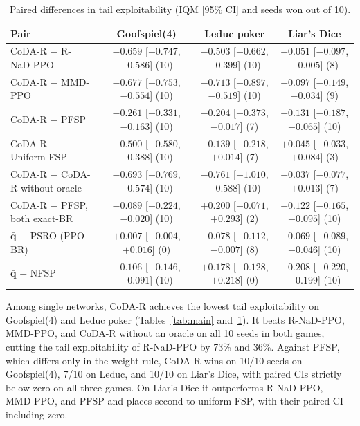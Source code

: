 \documentclass{article}
\theoremstyle{plain}
\theoremstyle{remark}
\newcommand{\bq}{{\bm{q}}}
\newcommand{\codar}{CoDA-R}
\newcommand{\rnad}{R-NaD-PPO}
\begin{document}
\begin{table}[t]
\caption{Paired differences in tail exploitability (IQM [95\% CI] and seeds won out of 10).}
\label{tab:paired}
\begin{center}
\scriptsize
\setlength{\tabcolsep}{2.5pt}
\begin{tabular}{lccc}
\toprule
Pair & Goofspiel(4) & Leduc poker & Liar's Dice \\
\midrule
\codar{} $-$ \rnad{} & $-0.659$ [$-0.747$, $-0.586$] (10) & $-0.503$ [$-0.662$, $-0.399$] (10) & $-0.051$ [$-0.097$, $-0.005$] (8) \\
\codar{} $-$ MMD-PPO & $-0.677$ [$-0.753$, $-0.554$] (10) & $-0.713$ [$-0.897$, $-0.519$] (10) & $-0.097$ [$-0.149$, $-0.034$] (9) \\
\codar{} $-$ PFSP & $-0.261$ [$-0.331$, $-0.163$] (10) & $-0.204$ [$-0.373$, $-0.017$] (7) & $-0.131$ [$-0.187$, $-0.065$] (10) \\
\codar{} $-$ Uniform FSP & $-0.500$ [$-0.580$, $-0.388$] (10) & $-0.139$ [$-0.218$, $+0.014$] (7) & $+0.045$ [$-0.033$, $+0.084$] (3) \\
\codar{} $-$ \codar{} without oracle & $-0.693$ [$-0.769$, $-0.574$] (10) & $-0.761$ [$-1.010$, $-0.588$] (10) & $-0.037$ [$-0.077$, $+0.013$] (7) \\
\codar{} $-$ PFSP, both exact-BR & $-0.089$ [$-0.224$, $-0.020$] (10) & $+0.200$ [$+0.071$, $+0.293$] (2) & $-0.122$ [$-0.165$, $-0.095$] (10) \\
$\bar{\bq}$ $-$ PSRO (PPO BR) & $+0.007$ [$+0.004$, $+0.016$] (0) & $-0.078$ [$-0.112$, $-0.007$] (8) & $-0.069$ [$-0.089$, $-0.046$] (10) \\
$\bar{\bq}$ $-$ NFSP & $-0.106$ [$-0.146$, $-0.091$] (10) & $+0.178$ [$+0.128$, $+0.218$] (0) & $-0.208$ [$-0.220$, $-0.199$] (10) \\
\bottomrule
\end{tabular}
\end{center}
\end{table}

Among single networks, \codar{} achieves the lowest tail exploitability on Goofspiel(4) and Leduc poker (Tables~\ref{tab:main} and~\ref{tab:paired}). It beats \rnad{}, MMD-PPO, and \codar{} without an oracle on all 10 seeds in both games, cutting the tail exploitability of \rnad{} by 73\% and 36\%. Against PFSP, which differs only in the weight rule, \codar{} wins on 10/10 seeds on Goofspiel(4), 7/10 on Leduc, and 10/10 on Liar's Dice, with paired CIs strictly below zero on all three games. On Liar's Dice it outperforms \rnad{}, MMD-PPO, and PFSP and places second to uniform FSP, with their paired CI including zero.
\end{document}
